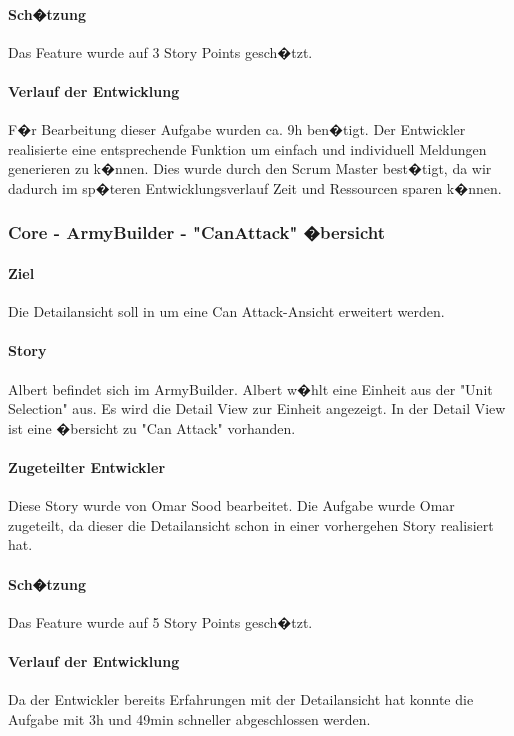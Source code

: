 \documentclass[12pt, titlepage]{scrartcl}
\begin{document}
			\paragraph{Sch�tzung}
			Das Feature wurde auf 3 Story Points gesch�tzt.
			\paragraph{Verlauf der Entwicklung} 
			F�r Bearbeitung dieser Aufgabe wurden ca. 9h ben�tigt. Der Entwickler realisierte eine entsprechende Funktion um einfach und individuell Meldungen generieren zu k�nnen. Dies wurde durch den Scrum Master best�tigt, da wir dadurch im sp�teren Entwicklungsverlauf Zeit und Ressourcen sparen k�nnen.
			
			\subsubsection{Core - ArmyBuilder - "CanAttack" �bersicht}
			\paragraph{Ziel} Die Detailansicht soll in um eine \glqq Can Attack\grqq-Ansicht erweitert werden.
			\paragraph{Story} Albert befindet sich im ArmyBuilder. Albert w�hlt eine Einheit aus der "Unit Selection" aus. Es wird die Detail View zur Einheit angezeigt. In der Detail View ist eine �bersicht zu "Can Attack" vorhanden.
			\paragraph{Zugeteilter Entwickler} Diese Story wurde von Omar Sood bearbeitet. Die Aufgabe wurde Omar zugeteilt, da dieser die Detailansicht schon in einer vorhergehen Story realisiert hat.
			\paragraph{Sch�tzung}
			Das Feature wurde auf 5 Story Points gesch�tzt.
			\paragraph{Verlauf der Entwicklung} 
			Da der Entwickler bereits Erfahrungen mit der Detailansicht hat konnte die Aufgabe mit 3h und 49min schneller abgeschlossen werden.
			
\end{document}
